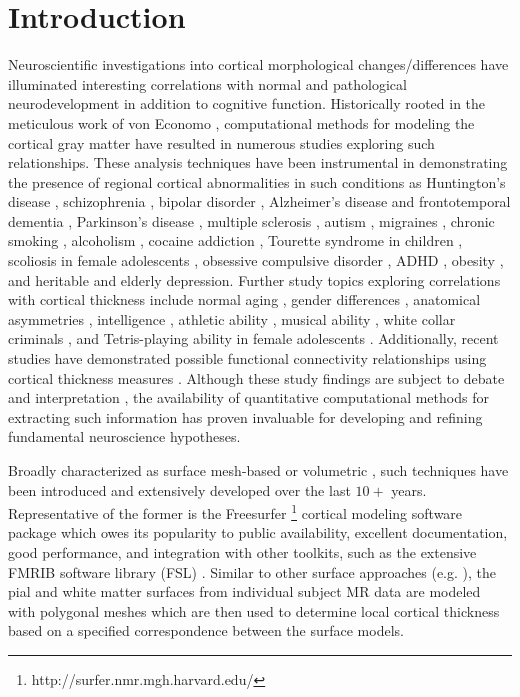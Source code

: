 \section{Introduction}

Neuroscientific investigations into cortical morphological changes/differences have illuminated
interesting correlations with normal and pathological neurodevelopment in 
addition to cognitive function.
Historically rooted in the meticulous work of von Economo \citep{economo2008},
computational methods for modeling the
cortical gray matter have resulted in numerous studies 
exploring such relationships.  
These analysis techniques
have been instrumental in demonstrating 
the presence of regional cortical abnormalities in such conditions as 
Huntington's disease \citep{rosas2002,rosas2005,selemon2004}, 
schizophrenia \citep{nesvag2008}, bipolar disorder \cite{lyoo2006}, Alzheimer's disease and frontotemporal
dementia \citep{du2007,dickerson2009}, Parkinson's disease \citep{jubault2011},
multiple sclerosis \citep{ramasamy2009}, autism \citep{chung2005,hardan2006},
migraines \citep{dasilva2007}, chronic smoking \citep{kuhn2010}, alcoholism \citep{fortier2011},
cocaine addiction \citep{makris2008}, Tourette syndrome in children \citep{sowell2008},
scoliosis in
female adolescents \citep{wang2012}, obsessive compulsive
disorder \citep{shin2007}, ADHD \citep{almeida-montes2012}, obesity \citep{raji2010}, and heritable \citep{peterson2009}
and elderly \citep{ballmaier2004} depression.  Further study 
topics exploring correlations with cortical thickness include
normal aging \citep{kochunov2011},
gender differences \citep{luders2006a},
anatomical asymmetries 
\citep{luders2006,amunts2007}, intelligence \citep{shaw2006}, athletic
ability \citep{wei2011}, musical ability \citep{bermudez2009,foster2010}, 
white collar criminals \citep{raine2011}, and Tetris-playing
ability in female adolescents \citep{haier2009}.  Additionally,
recent studies have demonstrated possible functional 
connectivity relationships using cortical thickness measures
\cite{worsley2005,lerch2006,he2007}.
Although these study findings
are subject to debate and interpretation \citep{gernsbacher2007}, 
the availability of quantitative
computational methods for extracting such information
has proven invaluable for developing and refining fundamental 
neuroscience hypotheses.

Broadly characterized as surface mesh-based or volumetric \citep{scott2009,clarkson2011}, such 
techniques have been introduced and extensively developed over 
the last $10+$ years.  Representative of the former is the
Freesurfer%
\footnote{
http://surfer.nmr.mgh.harvard.edu/
}
cortical modeling software package \citep{dale1999,fischl1999,fischl2000,fischl2002,fischl2004}
which owes its popularity to public availability, excellent documentation, 
good performance, and  integration with other toolkits, such as the extensive FMRIB software 
library (FSL) \citep{smith2004}.  Similar to other surface
approaches (e.g. \cite{davatzikos1996,magnotta1999,macdonald2000,kim2005}), the pial
and white matter surfaces from individual subject MR data are modeled with polygonal meshes  
which are then used to determine local cortical thickness based on a specified correspondence between 
the surface models.

